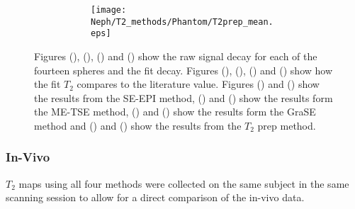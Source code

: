 \begin{figure}[H]
\begin{subfigure}[c]{0.9\textwidth}
\begin{subfigure}[c]{0.47\textwidth}
		\end{subfigure}
		\hfill
		\begin{subfigure}[c]{0.47\textwidth}
			\centering
			\texttt{[image: Neph/T2\_methods/Phantom/T2prep\_mean.eps]}
			\caption{}
			\label{fig:neph_phantom_t2prep_mean}
		\end{subfigure}
	\end{subfigure}
	\caption{Figures (), (), () and () show the raw signal decay for each of the fourteen spheres and the fit decay. Figures (), (), () and () show how the fit $T_2$ compares to the literature value. Figures () and () show the results from the \ac{SE}-\ac{EPI} method, () and () show the results form the \ac{ME-TSE} method, () and () show the results form the \ac{GraSE} method and () and () show the results from the $T_2$ prep method.} 
	\label{fig:neph_phantom}
\end{figure}


\subsubsection{In-Vivo}

$T_2$ maps using all four methods were collected on the same subject in the same scanning session to allow for a direct comparison of the in-vivo data.\\ 

